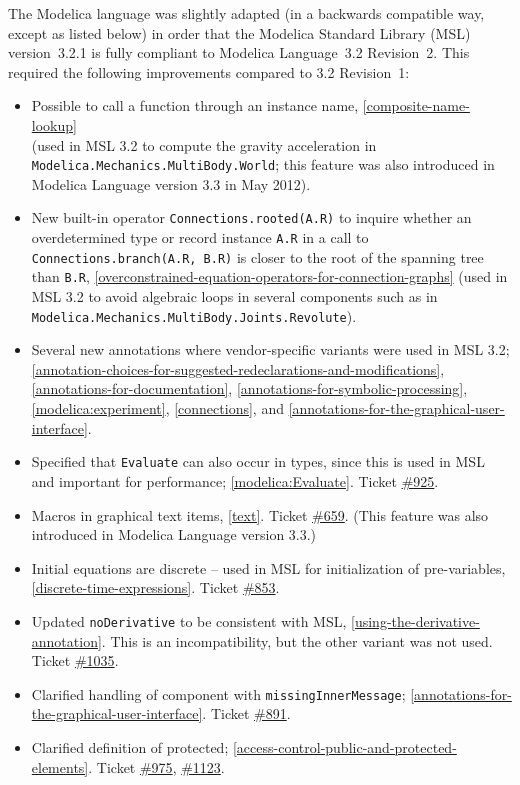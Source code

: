 The Modelica language was slightly adapted (in a backwards compatible way, except as listed below) in order that the Modelica Standard Library (MSL) version~3.2.1 is fully compliant to Modelica
Language~3.2 Revision~2.  This required the following improvements compared to 3.2 Revision~1:
\begin{itemize}
\item
  Possible to call a function through an instance name, \cref{composite-name-lookup}\\
  (used in MSL 3.2 to compute the gravity acceleration in \lstinline!Modelica.Mechanics.MultiBody.World!; this feature was also introduced in Modelica Language version 3.3 in May 2012).
\item
  New built-in operator \lstinline!Connections.rooted(A.R)! to inquire whether an overdetermined type or record instance \lstinline!A.R! in a call to \lstinline!Connections.branch(A.R, B.R)! is closer to the root of the spanning tree than \lstinline!B.R!, \cref{overconstrained-equation-operators-for-connection-graphs} (used in MSL 3.2 to avoid algebraic loops in several components such as in \lstinline!Modelica.Mechanics.MultiBody.Joints.Revolute!).
\item
  Several new annotations where vendor-specific variants were used in MSL 3.2; \cref{annotation-choices-for-suggested-redeclarations-and-modifications}, \cref{annotations-for-documentation}, \cref{annotations-for-symbolic-processing}, \cref{modelica:experiment}, \cref{connections}, and \cref{annotations-for-the-graphical-user-interface}.
\item
  Specified that \lstinline!Evaluate! can also occur in types, since this is used in MSL and important for performance; \cref{modelica:Evaluate}.
  Ticket \href{https://github.com/modelica/ModelicaSpecification/issues/925}{\#925}.
\item
  Macros in graphical text items, \cref{text}. Ticket
  \href{https://github.com/modelica/ModelicaSpecification/issues/659}{\#659}. (This
  feature was also introduced in Modelica Language version 3.3.)
\item
  Initial equations are discrete -- used in MSL for initialization of pre-variables, \cref{discrete-time-expressions}.
  Ticket \href{https://github.com/modelica/ModelicaSpecification/issues/853}{\#853}.
\item
  Updated \lstinline!noDerivative! to be consistent with MSL, \cref{using-the-derivative-annotation}.  This is an incompatibility, but the other variant was not used.
  Ticket \href{https://github.com/modelica/ModelicaSpecification/issues/1035}{\#1035}.
\item
  Clarified handling of component with \lstinline!missingInnerMessage!; \cref{annotations-for-the-graphical-user-interface}.
  Ticket \href{https://github.com/modelica/ModelicaSpecification/issues/891}{\#891}.
\item
  Clarified definition of protected; \cref{access-control-public-and-protected-elements}. Ticket
  \href{https://github.com/modelica/ModelicaSpecification/issues/975}{\#975},
  \href{https://github.com/modelica/ModelicaSpecification/issues/1123}{\#1123}.
\end{itemize}

